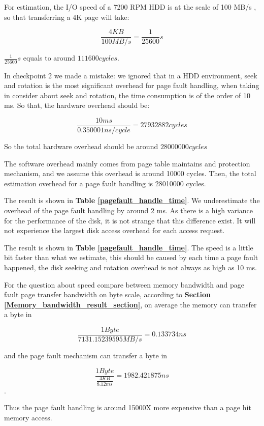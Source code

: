 For estimation, the I/O speed of a 7200 RPM HDD is at the scale of 100 MB/s \cite{wiki:hdd}, so that transferring a 4K page will take:

$$ \frac{4KB}{100 MB/s} = \frac{1}{25600} s $$

$\frac{1}{25600} s$ equals to around $111600 cycles$.

In checkpoint 2 we made a mistake: we ignored that in a HDD environment, seek and rotation is the most significant overhead for page fault handling, when taking in consider about seek and rotation, the time consumption is of the order of 10 ms. So that, the hardware overhead should be:

$$\frac{10 ms}{0.350001 ns/cycle} = 27932882 cycles$$

So the total hardware overhead should be around $28000000 cycles$

The software overhead mainly comes from page table maintains and protection mechanism, and we assume this overhead is around 10000 cycles. Then, the total estimation overhead for a page fault handling is 28010000 cycles.

The result is shown in \textbf{Table \ref{pagefault_handle_time}}. We underestimate the overhead of the page fault handling by around 2 ms. As there is a high variance for the performance of the disk, it is not strange that this difference exist. It will not experience the largest disk access overhead for each access request.

The result is shown in \textbf{Table \ref{pagefault_handle_time}}. The speed is a little bit faster than what we estimate, this should be caused by each time a page fault happened, the disk seeking and rotation overhead is not always as high as 10 ms.

For the question about speed compare between memory bandwidth and page fault page transfer bandwidth on byte scale, according to \textbf{Section \ref{Memory_bandwidth_result_section}}, on average the memory can transfer a byte in

$$\frac{1 Byte}{7131.15239595 MB/s} = 0.133734 ns $$

and the page fault mechanism can transfer a byte in

$$\frac{1 Byte}{\frac{4 KB}{8.12 ms}} = 1982.421875 ns $$.

Thus the page fault handling is around 15000X more expensive than a page hit memory access.

